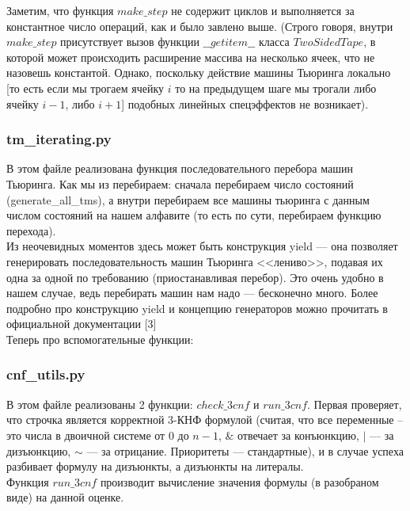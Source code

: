 \documentclass[paper=a4, fontsize=11pt]{scrartcl}
\begin{document}
Заметим, что функция $make\_step$ не содержит циклов и выполняется за константное
число операций, как и было завлено выше. (Строго говоря, внутри $make\_step$
присутствует вызов функции $\_\_getitem\_\_$ класса $TwoSidedTape$, в которой
может происходить расширение массива на несколько ячеек, что не назовешь
константой. Однако, поскольку действие машины Тьюринга локально [то есть если
мы трогаем ячейку $i$ то на предыдущем шаге мы трогали либо ячейку
$i - 1$, либо $i + 1$] подобных линейных спецэффектов не возникает).\\

\subsubsection{tm\_iterating.py}

В этом файле реализована функция последовательного перебора машин Тьюринга.
Как мы из перебираем: сначала перебираем число состояний (generate\_all\_tms), а
внутри перебираем все машины тьюринга с данным числом состояний на нашем
алфавите (то есть по сути, перебираем функцию перехода).\\

Из неочевидных моментов здесь может быть конструкция yield --- она позволяет
генерировать последовательность машин Тьюринга <<лениво>>, подавая их одна за
одной по требованию (приостанавливая перебор). Это очень удобно в нашем случае,
ведь перебирать машин нам надо --- бесконечно много.
Более подробно про конструкцию yield и концепцию генераторов можно прочитать
в официальной документации [3] \\


Теперь про вспомогательные функции:\\

\subsubsection{cnf\_utils.py}

В этом файле реализованы 2 функции: $check\_3cnf$ и $run\_3cnf$.
Первая проверяет,
что строчка является корректной 3-КНФ формулой
(считая, что все переменные -- это числа в двоичной системе от 0 до $n - 1$, \&
отвечает за конъюнкцию, $|$ --- за дизъюнкцию, $\sim$ --- за отрицание.
Приоритеты --- стандартные), и в случае успеха разбивает формулу на дизъюнкты,
а дизъюнкты на литералы.\\

Функция $run\_3cnf$ производит вычисление значения формулы (в разобраном виде) на
данной оценке.\\
\end{document}
